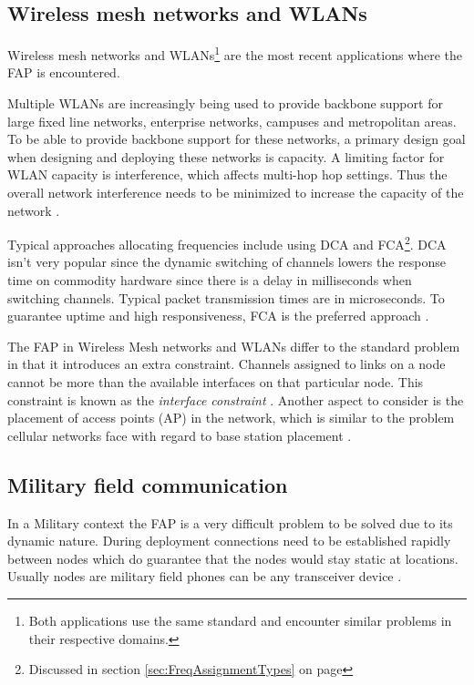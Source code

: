 \subsection{Wireless mesh networks and WLANs}
Wireless mesh networks and WLANs\footnote{Both applications use the same standard and encounter similar problems in their respective domains.} are the most recent applications where the FAP is encountered. 

Multiple WLANs are increasingly being used to provide backbone support for large fixed line networks, enterprise networks, campuses and metropolitan areas. To be able to provide backbone support for these networks, a primary design goal when designing and deploying these networks is capacity. A limiting factor for WLAN capacity is interference, which affects multi-hop hop settings. Thus the overall network interference needs to be minimized to increase the capacity of the network \cite{MultiradioMeshNetworks}. 

Typical approaches allocating frequencies include using DCA and FCA\footnote{Discussed in section \ref{sec:FreqAssignmentTypes} on page \pageref{sec:FreqAssignmentTypes}}. DCA isn't very popular since the dynamic switching of channels lowers the response time on commodity hardware since there is a delay in milliseconds when switching channels. Typical packet transmission times are in microseconds. To guarantee uptime and high responsiveness, FCA is the preferred approach \cite{MultiradioMeshNetworks}.

The FAP in Wireless Mesh networks and WLANs differ to the standard problem in that it introduces an extra constraint. Channels assigned to links on a node cannot be more than the available interfaces on that particular node. This constraint is known as the \emph{interface constraint} \cite{MultiradioMeshNetworks}. Another aspect to consider is the placement of access points (AP) in the network, which is similar to the problem cellular networks face with regard to base station placement \cite{Karen2004}.

\subsection{Military field communication}
In a Military context the FAP is a very difficult problem to be solved due to its dynamic nature. During deployment connections need to be established rapidly between nodes which do guarantee that the nodes would stay static at locations. Usually nodes are military field phones can be any transceiver device \cite{CALMA,DynamicFAP}. 

